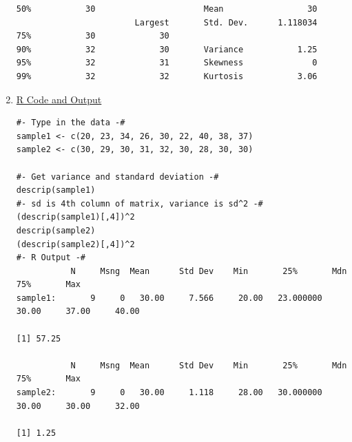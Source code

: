 \documentclass[11pt,letterpaper,fleqn]{report}
\begin{document}
\begin{enumerate}[]
{\begin{verbatim}
50%           30                      Mean                 30
                        Largest       Std. Dev.      1.118034
75%           30             30
90%           32             30       Variance           1.25
95%           32             31       Skewness              0
99%           32             32       Kurtosis           3.06

\end{verbatim}}
\item \underline{R Code and Output}
{\scriptsize
\begin{verbatim}
#- Type in the data -#
sample1 <- c(20, 23, 34, 26, 30, 22, 40, 38, 37)
sample2 <- c(30, 29, 30, 31, 32, 30, 28, 30, 30)

#- Get variance and standard deviation -#
descrip(sample1)
#- sd is 4th column of matrix, variance is sd^2 -#
(descrip(sample1)[,4])^2
descrip(sample2)
(descrip(sample2)[,4])^2
#- R Output -#
           N     Msng  Mean      Std Dev    Min       25%       Mdn       75%       Max     
sample1:       9     0   30.00     7.566     20.00   23.000000   30.00     37.00     40.00  

[1] 57.25

           N     Msng  Mean      Std Dev    Min       25%       Mdn       75%       Max     
sample2:       9     0   30.00     1.118     28.00   30.000000   30.00     30.00     32.00  

[1] 1.25
\end{verbatim}}
\end{enumerate}
\end{document}
